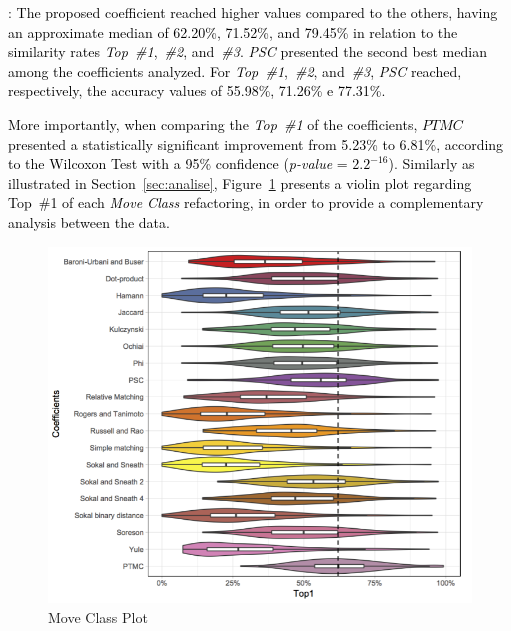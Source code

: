 \documentclass[smallextended,natbib]{svjour3}
\begin{document}
{: \textcolor{black}{The proposed coefficient reached higher values compared to the others, having an approximate median of 62.20\%, 71.52\%, and 79.45\% in relation to the similarity rates \textit{Top~\#1},~\textit{\#2}, and~\textit{\#3}. \textit{PSC} presented the second best median among the coefficients analyzed. For \textit{Top~\#1},~\textit{\#2}, and~\textit{\#3}, \textit{PSC} reached, respectively, the accuracy values of 55.98\%, 71.26\% e 77.31\%.} %

\textcolor{black}{More importantly, when comparing the \textit{Top~\#1} of the coefficients, $PTMC$ presented a statistically significant improvement from 5.23\% to 6.81\%, according to the Wilcoxon Test with a 95\% confidence (\textit{p-value} = ${2.2}^{-16}$)}. %
\textcolor{black}{Similarly as illustrated in Section~\ref{sec:analise}, Figure~\ref{fig:graph2} presents a violin plot regarding Top~\#1 of each \textit{Move Class} refactoring, in order to provide a complementary analysis between the data.}\\[-0.2cm]

\begin{figure}[ht]
\centering
\includegraphics[scale=0.36]{MC.png}
\vspace{-5pt}
\caption{Move Class Plot}
\label{fig:graph2}
\end{figure}

}
\end{document}
